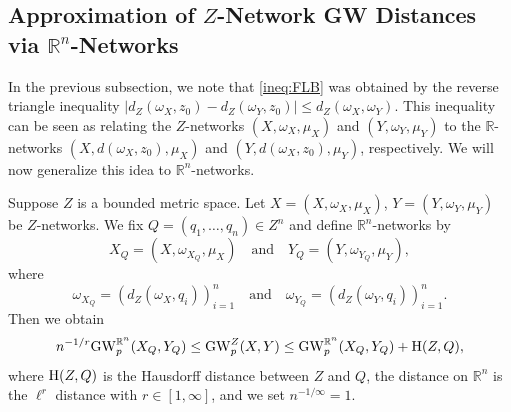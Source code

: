 \documentclass[twoside,11pt]{article}
\theoremstyle{definition}
\newcommand{\dgwz}{\mathrm{GW}_p^Z}
\newcommand{\dgwRn}{\mathrm{GW}_p^{\mathbb{R}^n}}
\begin{document}
\subsection{Approximation of \texorpdfstring{$Z$}{Z}-Network GW Distances via \texorpdfstring{$\mathbb{R}^n$}{Rn}-Networks}
In the previous subsection, we note that \eqref{ineq:FLB} was obtained by the reverse triangle inequality $|d_Z(\omega_X,z_0)-d_Z(\omega_Y,z_0)|\leq d_Z(\omega_X,\omega_Y)$. This inequality can be seen as relating the $Z$-networks $(X, \omega_X, \mu_X)$ and $(Y,\omega_Y, \mu_Y)$ to the $\mathbb{R}$-networks $(X, d(\omega_X,z_0), \mu_X)$ and $(Y, d(\omega_X,z_0), \mu_Y)$, respectively. We will now generalize this idea to $\mathbb{R}^n$-networks.





\begin{theorem}
    \label{thm: approximation_Rn}
    Suppose $Z$ is a bounded metric space. Let $X=(X,\omega_X,\mu_X)$, $Y=(Y,\omega_Y,\mu_Y)$ be $Z$-networks. We fix $Q=(q_1,\ldots,q_n)\in Z^n$  and define $\mathbb{R}^n$-networks by 
    \[
    X_{Q}=(X,\omega_{X_Q},\mu_X) \quad \mbox{and} \quad Y_{Q}=(Y, \omega_{Y_Q},\mu_Y),
    \]
    where 
    \[
    \omega_{X_Q} = (d_Z(\omega_X,q_i))_{i=1}^{n} \quad \mbox{and} \quad  \omega_{Y_Q}=(d_Z(\omega_Y,q_i))_{i=1}^{n}.
    \]
    Then we obtain
    \begin{equation}
        n^{-1/r}\dgwRn(X_{Q},Y_{Q}) \leq \dgwz(X, Y) \leq \dgwRn(X_{Q}, Y_{Q}) + \textnormal{H}(Z,Q),
    \end{equation}
    where $\textnormal{H}(Z,Q)$ is the Hausdorff distance between $Z$ and $Q$, the distance on $\mathbb{R}^n$ is the $\ell^{r}$ distance with $r\in [1,\infty]$, and we set $n^{-1/\infty} = 1$. 
\end{theorem}
\end{document}
